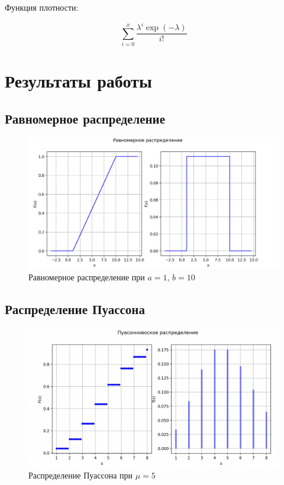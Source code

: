 Функция плотности:

\begin{equation*}
    \sum_{i=0}^{x} \frac{\lambda^i \exp(-\lambda)}{i!}
\end{equation*}

\section{Результаты работы}

\subsection{Равномерное распределение}

\begin{figure}[h!]
	\includegraphics[width=\linewidth]{assets/images/ravn.png}
	\caption{Равномерное распределение при $a=1$, $b=10$}
	\label{fig:r1}
\end{figure}

\subsection{Распределение Пуассона}

\begin{figure}[h!]
	\includegraphics[width=\linewidth]{assets/images/poisson.png}
	\caption{Распределение Пуассона при $\mu=5$}
	\label{fig:r2}
\end{figure}